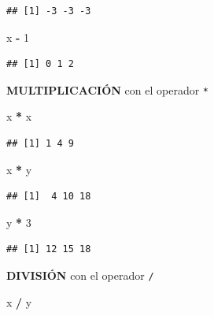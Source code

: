 \documentclass[
]{book}
\newenvironment{Shaded}{\begin{snugshade}}{\end{snugshade}}
\newcommand{\DecValTok}[1]{\textcolor[rgb]{0.00,0.00,0.81}{#1}}
\newcommand{\NormalTok}[1]{#1}
\newcommand{\SpecialCharTok}[1]{\textcolor[rgb]{0.81,0.36,0.00}{\textbf{#1}}}
\begin{document}
\begin{verbatim}
## [1] -3 -3 -3
\end{verbatim}

\begin{Shaded}
\begin{Highlighting}[]
\NormalTok{x }\SpecialCharTok{{-}} \DecValTok{1}
\end{Highlighting}
\end{Shaded}

\begin{verbatim}
## [1] 0 1 2
\end{verbatim}

\textbf{MULTIPLICACIÓN} con el operador \texttt{*}

\begin{Shaded}
\begin{Highlighting}[]
\NormalTok{x }\SpecialCharTok{*}\NormalTok{ x}
\end{Highlighting}
\end{Shaded}

\begin{verbatim}
## [1] 1 4 9
\end{verbatim}

\begin{Shaded}
\begin{Highlighting}[]
\NormalTok{x }\SpecialCharTok{*}\NormalTok{ y }
\end{Highlighting}
\end{Shaded}

\begin{verbatim}
## [1]  4 10 18
\end{verbatim}

\begin{Shaded}
\begin{Highlighting}[]
\NormalTok{y }\SpecialCharTok{*} \DecValTok{3} 
\end{Highlighting}
\end{Shaded}

\begin{verbatim}
## [1] 12 15 18
\end{verbatim}

\textbf{DIVISIÓN} con el operador \texttt{/}

\begin{Shaded}
\begin{Highlighting}[]
\NormalTok{x }\SpecialCharTok{/}\NormalTok{ y}
\end{Highlighting}
\end{Shaded}
\end{document}
